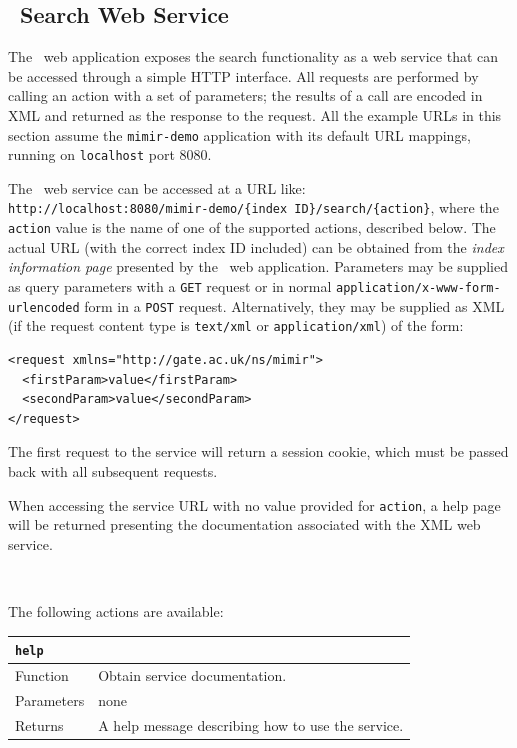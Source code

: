\subsection{\Mimir\ Search Web Service}\label{sec:search:service}

The \Mimir\ web application exposes the search functionality as a web service
that can be accessed through a simple HTTP interface. All requests are performed
by calling an action with a set of parameters; the results of a call are encoded
in XML and returned as the response to the request.  All the example URLs in
this section assume the {\tt mimir-demo} application with its
default URL mappings, running on {\tt localhost} port 8080.

The \Mimir\ web service can be accessed at a URL like:\\
{\tt http://localhost:8080/mimir-demo/\{index ID\}/search/\{action\}},
where the {\tt action} value is the name of one of the supported actions,
described below. The actual URL (with the correct index ID included) can be
obtained from the {\em index information page} presented by  the \Mimir\ web
application.  Parameters may be supplied as query parameters with a {\tt GET}
request or in normal {\tt application/x-www-form-urlencoded} form in a
{\tt POST} request.  Alternatively, they may be supplied as XML (if the request
content type is {\tt text/xml} or {\tt application/xml}) of the form:
\begin{verbatim}
<request xmlns="http://gate.ac.uk/ns/mimir">
  <firstParam>value</firstParam>
  <secondParam>value</secondParam>
</request>
\end{verbatim}

The first request to the service will return a session cookie, which must be
passed back with all subsequent requests.

When accessing the service URL with no value provided for {\tt action}, a help
page will be returned presenting the documentation associated with the XML web
service.

\lstcompact\

The following actions are available:\\
\begin{longtable}{|p{1.8cm}|p{10.2cm}|}
\multicolumn{2}{l}{\tt \bf help}\\
\hline
Function & Obtain service documentation.\\
\hline
Parameters & none\\
\hline
Returns & A help message describing how to use the service.\\
\hline
\end{longtable}

